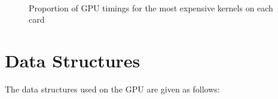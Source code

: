 \begin{figure}[!htc]
        \\ 
        \caption{ Proportion of GPU timings for the most expensive kernels on each card }
        \label{fig:pies}
\end{figure}

\pagebreak
\clearpage

\section{Data Structures}
The data structures used on the GPU are given as follows:

